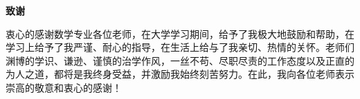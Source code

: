
{} %
\begin{center}
\bf{} 致\hspace{2em}谢
\end{center}


衷心的感谢数学专业各位老师，在大学学习期间，给予了我极大地鼓励和帮助，在学习上给予了我严谨、耐心的指导，在生活上给与了我亲切、热情的关怀。老师们渊博的学识、谦逊、谨慎的治学作风，一丝不苟、尽职尽责的工作态度以及正直的为人之道，都将是我终身受益，并激励我始终刻苦努力。在此，我向各位老师表示崇高的敬意和衷心的感谢！

